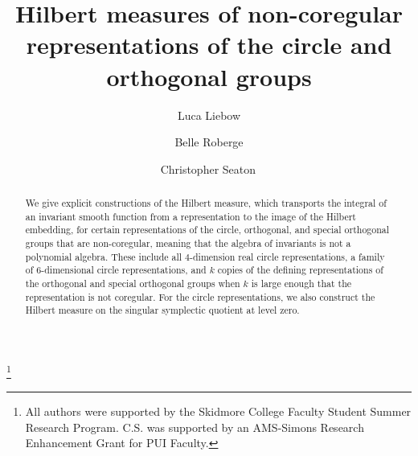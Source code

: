 \documentclass[twoside]{amsart}
\theoremstyle{definition}
\theoremstyle{remark}
\numberwithin{equation}{section}
\begin{document}
\title[Hilbert measures of non-coregular representations]{Hilbert measures of non-coregular representations of the circle and orthogonal groups}

\author[L.~Liebow]{Luca Liebow}
\address{Department of Mathematics and Statistics,
Skidmore College,
815 North Broadway,
Saratoga Springs, NY 12866, USA}

\author[B.~Roberge]{Belle Roberge}
\address{Department of Mathematics and Statistics,
Skidmore College,
815 North Broadway,
Saratoga Springs, NY 12866, USA}

\author[C.~Seaton]{Christopher Seaton\,}
\address{Department of Mathematics and Statistics,
Skidmore College,
815 North Broadway,
Saratoga Springs, NY 12866, USA}



\thanks{All authors were supported by the Skidmore College Faculty Student Summer Research Program.
C.S. was supported by an AMS-Simons Research Enhancement Grant for PUI Faculty.}

\begin{abstract}
We give explicit constructions of the Hilbert measure, which transports the integral of an invariant smooth function from a representation to the image of the Hilbert embedding, for certain representations of the circle, orthogonal, and special orthogonal groups that are non-coregular, meaning that the algebra of invariants is not a polynomial algebra. These include all $4$-dimension real circle representations, a family of $6$-dimensional circle representations, and $k$ copies of the defining representations of the orthogonal and special orthogonal groups when $k$ is large enough that the representation is not coregular. For the circle representations, we also construct the Hilbert measure on the singular symplectic quotient at level zero.
\end{abstract}


\setcounter{tocdepth}{3}
\maketitle
\end{document}
